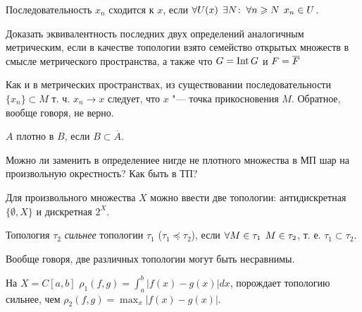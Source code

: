 \documentclass[main]{subfiles}
\begin{document}
\begin{definition}
  Последовательность \( x_n \) сходится к \( x \), если
  \( \forall {U(x)} \; \, \exists N \colon \: \forall {n \geqslant N} \; \, x_n \in U \).
\end{definition}

\begin{exercise}
  Доказать эквивалентность последних двух определений аналогичным
  метрическим, если в качестве топологии взято семейство
  открытых множеств в смысле метрического пространства,
  а также что \( G = \operatorname{Int} G \) и \( F = \overline{F}  \)
\end{exercise}

\begin{remark}
  Как и в метрических пространствах,
  из существовании последовательности
  \( \{ x_n \} \subset M \) т. ч. \( x_n \to x \)
  следует, что \( x \) "--- точка прикосновения \( M \).
  Обратное, вообще говоря, не верно.
\end{remark}

\begin{definition}
  \( A \) плотно в \( B \), если \( B \subset \overline{A} \).
\end{definition}

\begin{exercise}
  Можно ли заменить в определениее нигде не плотного множества в МП
  шар на произвольную окрестность? Как быть в ТП?
\end{exercise}

\begin{example}
  Для произвольного множества \( X \) можно ввести две
  топологии: антидискретная \( \{ \emptyset, X \} \)
  и дискретная \( 2^X \).
\end{example}

\begin{definition}
  Топология \( \tau_2 \) \emph{сильнее} топологии \( \tau_1 \)
  (\( \tau_1 \preceq \tau_2 \)),
  если \( \forall {M \in \tau_1} \; \, M \in \tau_2 \),
  т. е. \( \tau_1 \subset \tau_2 \).
\end{definition}

\begin{remark}
  Вообще говоря, две различных топологии могут быть несравнимы.
\end{remark}

\begin{example}
  На \( X = C[a, b] \) \( \rho_1(f, g) = \int_a^b |f(x) - g(x)| dx \),
  порождает топологию сильнее, чем
  \( \rho_2(f, g) = \max_x |f(x) - g(x)| \).
\end{example}
\end{document}
